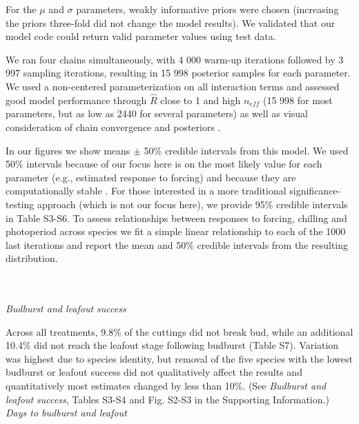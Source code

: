 \documentclass[11pt]{article}
\begin{document}
\noindent For the $\mu$ and $\sigma$ parameters, weakly informative priors were chosen (increasing the priors three-fold did not change the model results). We validated that our model code could return valid parameter values using test data. 

We ran four chains simultaneously, with 4 000 warm-up iterations followed by 3 997 sampling iterations, resulting in 15 998 posterior samples for each parameter. We used a non-centered parameterization on all interaction terms and assessed good model performance through $\hat{R}$ close to 1 and high $n_{eff}$ (15 998 for most parameters, but as low as 2440 for several parameters) as well as visual consideration of chain convergence and posteriors \citep{BDA}. 

In our figures we show means $\pm$ 50\% credible intervals from this model. We used 50\% intervals because of our focus here is on the most likely value for each parameter (e.g., estimated response to forcing) and because they are computationally stable \citep{BDA,Carpenter:2016aa}. For those interested in a more traditional significance-testing approach (which is not our focus here), we provide 95\% credible intervals in Table S3-S6. To assess relationships between responses to forcing, chilling and photoperiod across species we fit a simple linear relationship to each of the 1000 last iterations and report the mean and 50\% credible intervals from the resulting distribution.


\vspace{2ex}\\
\vspace{2ex}\\
\emph{Budburst and leafout success}

\noindent Across all treatments, 9.8\% of the cuttings did not break bud, while an additional 10.4\% did not reach the leafout stage following budburst (Table S7). Variation was highest due to species identity, but removal of the five species with the lowest  budburst or leafout success did not qualitatively affect the results and quantitatively most estimates changed by less than 10\%. (See \emph{Budburst and leafout success}, Tables S3-S4 and Fig. S2-S3 in the Supporting Information.)\\

\noindent \emph{Days to budburst and leafout}
\end{document}
